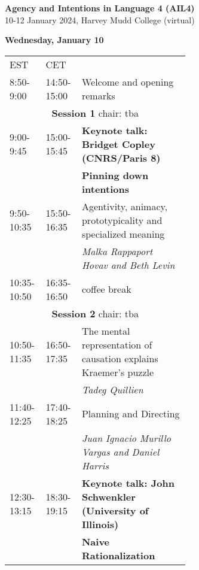 \documentclass[11pt]{article}
\title{}
\author{}
\date{}
\begin{document}

\textbf{\Large{Agency and Intentions in Language 4 (AIL4)}} \\
10-12 January 2024, Harvey Mudd College (virtual) \\[-7pt]
\makebox[\linewidth]{\rule{\textwidth}{0.4pt}}

\vspace{1cm}

\textbf{Wednesday, January 10}\\[7pt]
\begin{tabular}{ll p{0.6\linewidth}}
EST	& CET &  \\
\rowcolor{gray!30}
8:50-9:00 & 14:50-15:00 & Welcome and opening remarks\\
\multicolumn{3}{c}{{\bf Session 1} chair: tba } \\
\hline
9:00-9:45  & 15:00-15:45 & \textbf{Keynote talk: Bridget Copley (CNRS/Paris 8)} \\
&& \textbf{Pinning down intentions }\\
\hline
9:50-10:35  & 15:50-16:35   & Agentivity, animacy, prototypicality and specialized meaning\\
&& \textit{Malka Rappaport Hovav and Beth Levin} \\
\rowcolor{gray!30}
10:35-10:50 & 16:35-16:50   & coffee break \\
\multicolumn{3}{c}{{\bf Session 2} chair: tba}\\
\hline
10:50-11:35 & 16:50-17:35   & The mental representation of causation explains Kraemer's puzzle\\
&& \textit{Tadeg Quillien} \\
\hline
11:40-12:25 & 17:40-18:25   & Planning and Directing \\
&&\textit{Juan Ignacio Murillo Vargas and Daniel Harris} \\
\hline
12:30-13:15 & 18:30-19:15   & \textbf{Keynote talk: John Schwenkler (University of Illinois) }\\
&& \textbf{Naive Rationalization}\\
\end{tabular}

\vspace{2cm}
\end{document}
